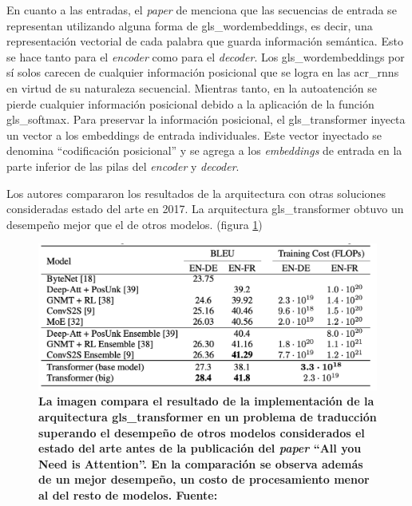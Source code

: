 En cuanto a las entradas, el \textit{paper} de \cite{https://doi.org/10.48550/arxiv.1706.03762} menciona que las secuencias de entrada se representan utilizando alguna forma de \gls{gls_wordembeddings}, es decir, una representación vectorial de cada palabra que guarda información semántica. Esto se hace tanto para el \textit{encoder} como para el \textit{decoder}. Los \gls{gls_wordembeddings} por sí solos carecen de cualquier información posicional que se logra en las \acrshort{acr_rnn}s en virtud de su naturaleza secuencial. Mientras tanto, en la autoatención se pierde cualquier información posicional debido a la aplicación de la función \gls{gls_softmax}. Para preservar la información posicional, el \Gls{gls_transformer} inyecta un vector a los embeddings de entrada individuales. Este vector inyectado se denomina ``codificación posicional'' y se agrega a los \textit{embeddings} de entrada en la parte inferior de las pilas del \textit{encoder} y \textit{decoder}.

Los autores compararon los resultados de la arquitectura con otras soluciones consideradas estado del arte en 2017. La arquitectura \Gls{gls_transformer} obtuvo un desempeño mejor que el de otros modelos. (figura \ref{fig-intro-bert-transresults}) 

\begin{figure}[ht!]
    \centering
    \includegraphics[scale=0.6]{figuras/intro-bert-transresults.png}
    \caption[BERT - Transformer Resultados]{\textbf{La imagen compara el resultado de la implementación de la arquitectura \Gls{gls_transformer} en un problema de traducción superando el desempeño de otros modelos considerados el estado del arte antes de la publicación del \textit{paper} ``All you Need is Attention''. En la comparación se observa además de un mejor desempeño, un costo de procesamiento menor al del resto de modelos. Fuente: \cite{https://doi.org/10.48550/arxiv.1706.03762}}}
    \label{fig-intro-bert-transresults}
\end{figure}

